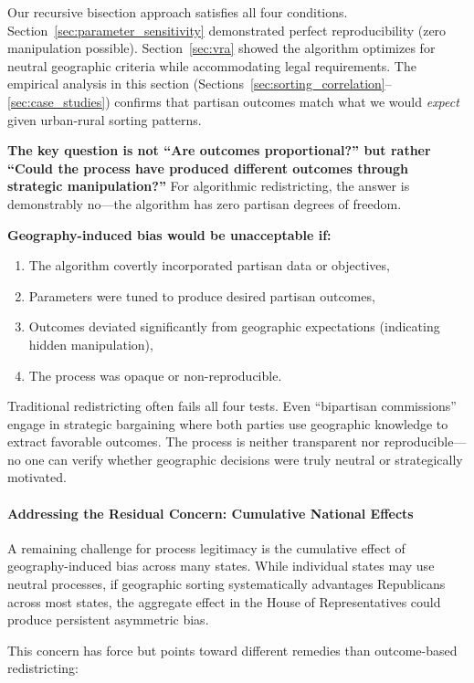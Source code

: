 Our recursive bisection approach satisfies all four conditions. Section~\ref{sec:parameter_sensitivity} demonstrated perfect reproducibility (zero manipulation possible). Section~\ref{sec:vra} showed the algorithm optimizes for neutral geographic criteria while accommodating legal requirements. The empirical analysis in this section (Sections~\ref{sec:sorting_correlation}--\ref{sec:case_studies}) confirms that partisan outcomes match what we would \textit{expect} given urban-rural sorting patterns.

\textbf{The key question is not ``Are outcomes proportional?'' but rather ``Could the process have produced different outcomes through strategic manipulation?''} For algorithmic redistricting, the answer is demonstrably no---the algorithm has zero partisan degrees of freedom.

\textbf{Geography-induced bias would be unacceptable if:}
\begin{enumerate}
\item The algorithm covertly incorporated partisan data or objectives,
\item Parameters were tuned to produce desired partisan outcomes,
\item Outcomes deviated significantly from geographic expectations (indicating hidden manipulation),
\item The process was opaque or non-reproducible.
\end{enumerate}

Traditional redistricting often fails all four tests. Even ``bipartisan commissions'' engage in strategic bargaining where both parties use geographic knowledge to extract favorable outcomes. The process is neither transparent nor reproducible---no one can verify whether geographic decisions were truly neutral or strategically motivated.

\paragraph{Addressing the Residual Concern: Cumulative National Effects}

A remaining challenge for process legitimacy is the cumulative effect of geography-induced bias across many states. While individual states may use neutral processes, if geographic sorting systematically advantages Republicans across most states, the aggregate effect in the House of Representatives could produce persistent asymmetric bias.

This concern has force but points toward different remedies than outcome-based redistricting:

